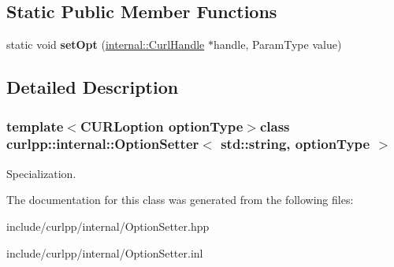 \subsection*{Static Public Member Functions}
\begin{DoxyCompactItemize}
\item 
\hypertarget{classcurlpp_1_1internal_1_1OptionSetter_3_01std_1_1string_00_01optionType_01_4_a90d627a2977ee430f8a720628ae5b6de}{static void {\bfseries set\-Opt} (\hyperlink{classcurlpp_1_1internal_1_1CurlHandle}{internal\-::\-Curl\-Handle} $\ast$handle, Param\-Type value)}\label{classcurlpp_1_1internal_1_1OptionSetter_3_01std_1_1string_00_01optionType_01_4_a90d627a2977ee430f8a720628ae5b6de}

\end{DoxyCompactItemize}


\subsection{Detailed Description}
\subsubsection*{template$<$C\-U\-R\-Loption option\-Type$>$class curlpp\-::internal\-::\-Option\-Setter$<$ std\-::string, option\-Type $>$}

Specialization. 

The documentation for this class was generated from the following files\-:\begin{DoxyCompactItemize}
\item 
include/curlpp/internal/Option\-Setter.\-hpp\item 
include/curlpp/internal/Option\-Setter.\-inl\end{DoxyCompactItemize}
